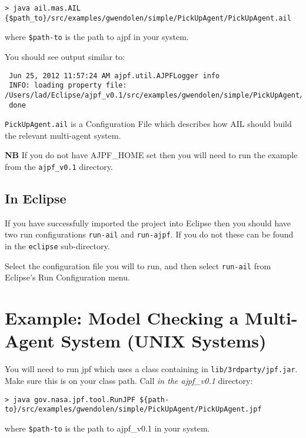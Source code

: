 \noindent \begin{lstlisting}[basicstyle=\tiny]
> java ail.mas.AIL {$path_to}/src/examples/gwendolen/simple/PickUpAgent/PickUpAgent.ail
\end{lstlisting}
\medskip

\noindent where \texttt{\${path-to}} is the path to ajpf in your system.

You should see output similar to:

\noindent \begin{lstlisting}
 Jun 25, 2012 11:57:24 AM ajpf.util.AJPFLogger info
 INFO: loading property file: /Users/lad/Eclipse/ajpf_v0.1/src/examples/gwendolen/simple/PickUpAgent/PickUpAgent.ail
 done
\end{lstlisting}
\medskip
 
\texttt{PickUpAgent.ail} is a Configuration File which describes how AIL should build the relevant multi-agent system.

{\bf NB}  If you do not have AJPF\_HOME set then you will need to run the example from the \texttt{ajpf\_v0.1} directory.

\subsection{In Eclipse}

If you have successfully imported the project into Eclipse then you should have two run configurations \texttt{run-ail} and \texttt{run-ajpf}.  If you do not these can be found in the \texttt{eclipse} sub-directory.

Select the configuration file you will to run, and then select \texttt{run-ail} from Eclipse's Run Configuration menu.


\section{Example: Model Checking a Multi-Agent System (UNIX Systems)}

You will need to run jpf which uses a class containing in \texttt{lib/3rdparty/jpf.jar}.  Make sure this is on your class path.  Call \emph{in the ajpf\_v0.1} directory:

\noindent \begin{lstlisting}[basicstyle=\tiny]
> java gov.nasa.jpf.tool.RunJPF ${path-to}/src/examples/gwendolen/simple/PickUpAgent/PickUpAgent.jpf
\end{lstlisting}
\medskip

\noindent where \texttt{\${path-to}} is the path to ajpf\_v0.1 in your system.

